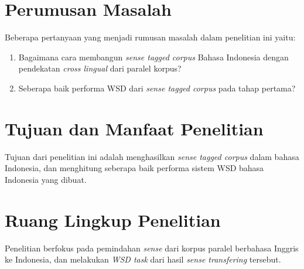 \section{Perumusan Masalah}
Beberapa pertanyaan yang menjadi rumusan masalah dalam penelitian ini yaitu:
\begin{enumerate}
	\item Bagaimana cara membangun \textit{sense tagged corpus} Bahasa Indonesia dengan pendekatan \textit{cross lingual} dari paralel korpus?
	\item Seberapa baik performa WSD dari \textit{sense tagged corpus} pada tahap pertama?
\end{enumerate}

\section{Tujuan dan Manfaat Penelitian}
Tujuan dari penelitian ini adalah menghasilkan \textit{sense tagged corpus} dalam bahasa Indonesia, dan menghitung seberapa baik performa sistem WSD bahasa Indonesia yang dibuat.
\section{Ruang Lingkup Penelitian}
Penelitian berfokus pada pemindahan \textit{sense} dari korpus paralel berbahasa Inggris ke Indonesia, dan melakukan \textit{WSD task} dari hasil \textit{sense transfering} tersebut.
